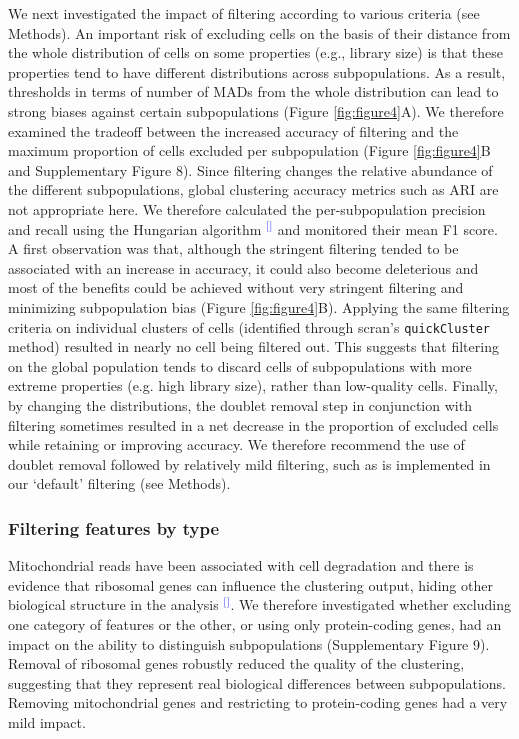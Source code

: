 \documentclass[11pt]{article}
\renewcommand{\cite}[1]{\textcolor{Blue}{$^[$\supercite{#1}$^]$}}
\begin{document}
We next investigated the impact of filtering according to various criteria (see Methods). An important risk of excluding cells on the basis of their distance from the whole distribution of cells on some properties (e.g., library size) is that these properties tend to have different distributions across subpopulations. As a result, thresholds in terms of number of MADs from the whole distribution can lead to strong biases against certain subpopulations (Figure \ref{fig:figure4}A). We therefore examined the tradeoff between the increased accuracy of filtering and the maximum proportion of cells excluded per subpopulation (Figure \ref{fig:figure4}B and Supplementary Figure 8). Since filtering changes the relative abundance of the different subpopulations, global clustering accuracy metrics such as ARI are not appropriate here. We therefore calculated the per-subpopulation precision and recall using the Hungarian algorithm \cite{PapadimitriouHu1998} and monitored their mean F1 score. A first observation was that, although the stringent filtering tended to be associated with an increase in accuracy, it could also become deleterious and most of the benefits could be achieved without very stringent filtering and minimizing subpopulation bias (Figure \ref{fig:figure4}B). Applying the same filtering criteria on individual clusters of cells (identified through scran's \texttt{quickCluster} method) resulted in nearly no cell being filtered out. This suggests that filtering on the global population tends to discard cells of subpopulations with more extreme properties (e.g. high library size), rather than low-quality cells. Finally, by changing the distributions, the doublet removal step in conjunction with filtering sometimes resulted in a net decrease in the proportion of excluded cells while retaining or improving accuracy. We therefore recommend the use of doublet removal followed by relatively mild filtering, such as is implemented in our `default' filtering (see Methods).


\subsubsection*{Filtering features by type}

Mitochondrial reads have been associated with cell degradation and there is evidence that ribosomal genes can influence the clustering output, hiding other biological structure in the analysis \cite{freytagComparison2018}. We therefore investigated whether excluding one category of features or the other, or using only protein-coding genes, had an impact on the ability to distinguish subpopulations (Supplementary Figure 9). Removal of ribosomal genes robustly reduced the quality of the clustering, suggesting that they represent real biological differences between subpopulations. Removing mitochondrial genes and restricting to protein-coding genes had a very mild impact.
\end{document}
